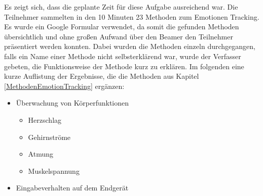 
Es zeigt sich, dass die geplante Zeit für diese Aufgabe ausreichend war. Die Teilnehmer sammelten in den 10 Minuten 23 Methoden zum Emotionen Tracking. Es wurde ein Google Formular verwendet, da somit die gefunden Methoden übersichtlich und ohne großen Aufwand über den Beamer den Teilnehmer präsentiert werden konnten. Dabei wurden die Methoden einzeln durchgegangen, falls ein Name einer Methode nicht selbsterklärend war, wurde der Verfasser gebeten, die Funktionsweise der Methode kurz zu erklären. Im folgenden eine kurze Auflistung der Ergebnisse, die die Methoden aus Kapitel \ref{MethodenEmotionTracking} ergänzen:

\begin{itemize}
	\item Überwachung von Körperfunktionen
	\begin{itemize}
		\item Herzschlag
		\item Gehirnströme
		\item Atmung
		\item Muskelspannung
	\end{itemize}
	\item Eingabeverhalten auf dem Endgerät	
\end{itemize}

